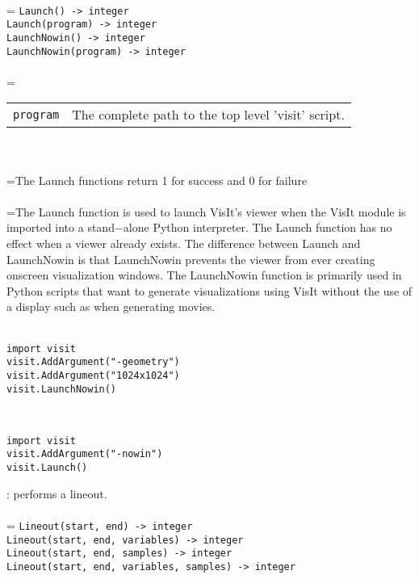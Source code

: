 \documentclass[10pt,a4paper]{report}
\begin{document}
 \\ 
\hangindent=\parindent 
\verb!Launch() -> integer!\\ 
\verb!Launch(program) -> integer!\\ 
\verb!LaunchNowin() -> integer!\\ 
\verb!LaunchNowin(program) -> integer!\\ [-3mm]

 \\ 
\hangindent=\parindent 
\begin{tabular}{lp{9cm}}
\verb!program! & The complete path to the top level 'visit' script. \\
\end{tabular} \\[-2mm]


 \\ 
\hangindent=\parindent The Launch functions return 1 for success and 0 for failure \\[-3mm] 

 \\ 
\hangindent=\parindent The Launch function is used to launch VisIt's viewer when the VisIt module is imported into a stand$-$alone Python interpreter. The Launch function has no effect when a viewer already exists. The difference between Launch and LaunchNowin is that LaunchNowin prevents the viewer from ever creating onscreen visualization windows. The LaunchNowin function is primarily used in Python scripts that want to generate visualizations using VisIt without the use of a display such as when generating movies. \\[-3mm] 

\\[-6mm]
\begin{verbatim}import visit
visit.AddArgument("-geometry")
visit.AddArgument("1024x1024")
visit.LaunchNowin()
\end{verbatim}
\\[-6mm]
\begin{verbatim}import visit
visit.AddArgument("-nowin")
visit.Launch()
\end{verbatim}
\newpage


{}
: performs a lineout.\\[-3mm]

 \\ 
\hangindent=\parindent 
\verb!Lineout(start, end) -> integer!\\ 
\verb!Lineout(start, end, variables) -> integer!\\ 
\verb!Lineout(start, end, samples) -> integer!\\ 
\verb!Lineout(start, end, variables, samples) -> integer!\\ [-3mm]
\end{document}
